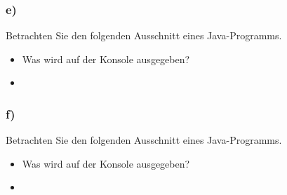 \begin{frame}[t]%
    \frametitle{\stitle \: e)}
  \medskip
  Betrachten Sie den folgenden Ausschnitt eines Java-Programms.
  
  \begin{itemize}
  \item Was wird auf der Konsole ausgegeben?
  \pause
  \item \code{[1, 4, 9, 16, 25]}
  \end{itemize}
\end{frame}

\begin{frame}[t]%
    \frametitle{\stitle \: f)}
  \medskip
  Betrachten Sie den folgenden Ausschnitt eines Java-Programms.
  
  \begin{itemize}
  \item Was wird auf der Konsole ausgegeben?
  \pause
  \item \code{[5, 4, 3, 2, 1]}
  \end{itemize}
\end{frame}
